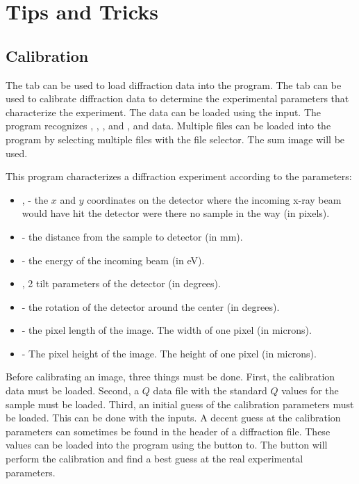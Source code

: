 \chapter{Tips and Tricks}

\section{Calibration}

The  tab can be used to load
diffraction data into the program. The tab can
be used to calibrate diffraction data to determine the 
experimental parameters that characterize the experiment. 
The data can be loaded using the  input. 
The program recognizes , , 
, and , and  data. 
Multiple files can be loaded into the program
by selecting multiple files with the file selector.
The sum image will be used.

This program characterizes a diffraction experiment 
according to the parameters:
\index{$\alpha$}
\index{$\beta$}
\begin{itemize}
    \item {},  - the $x$ 
and $y$ coordinates on the detector where the incoming 
x-ray beam would have hit the detector were there 
no sample in the way (in pixels).
    \item {} - the distance from the sample to 
    detector (in mm).
    \item {} - the energy of the incoming beam (in eV).
    \item {},  2 tilt parameters of 
    the detector (in degrees).
    \item {} - the rotation of the detector 
    around the center (in degrees).
    \item {} - the pixel length of the image. 
    The width of one pixel (in microns).
    \item {} - The pixel height of the image. 
    The height of one pixel (in microns).
\end{itemize}
Before calibrating an image, three things must be done. 
First, the calibration data must be loaded.
Second, a $Q$ data file with the standard $Q$ values for the
sample must be loaded.
Third, an initial guess of the calibration parameters must be
loaded. This can be done with the  inputs. A
decent guess at the calibration parameters can sometimes
be found in the header of a diffraction file. These values
can be loaded into the program using the  
button to.  The  button will perform the calibration 
and find a best guess at the real experimental parameters.

